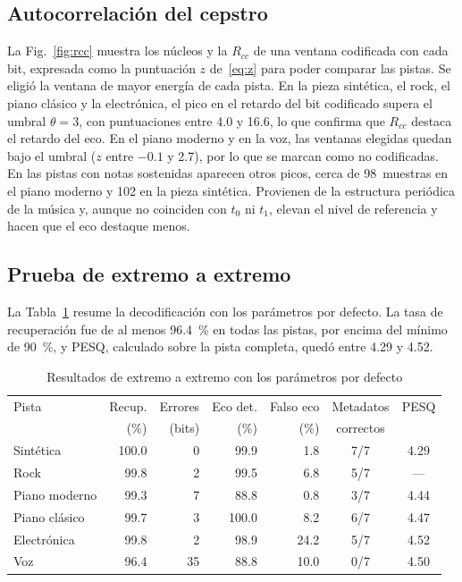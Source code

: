 \documentclass[journal]{IEEEtran}
\begin{document}
\subsection{Autocorrelación del cepstro}
La Fig.~\ref{fig:rcc} muestra los núcleos y la $R_{cc}$ de una ventana
codificada con cada bit, expresada como la puntuación $z$ de~\eqref{eq:z} para
poder comparar las pistas. Se eligió la ventana de mayor energía de cada pista.
En la pieza sintética, el rock, el piano clásico y la electrónica, el pico en
el retardo del bit codificado supera el umbral $\theta=3$, con puntuaciones
entre 4.0 y 16.6, lo que confirma que $R_{cc}$ destaca el retardo del eco. En
el piano moderno y en la voz, las ventanas elegidas quedan bajo el umbral ($z$
entre $-0.1$ y 2.7), por lo que se marcan como no codificadas. En las pistas
con notas sostenidas aparecen otros picos, cerca de 98~muestras en el piano
moderno y 102 en la pieza sintética. Provienen de la estructura periódica de la música y, aunque no
coinciden con $t_0$ ni $t_1$, elevan el nivel de referencia y hacen que el eco
destaque menos.

\subsection{Prueba de extremo a extremo}
La Tabla~\ref{tab:e2e} resume la decodificación con los parámetros por defecto.
La tasa de recuperación fue de al menos 96.4~\% en todas las pistas, por encima
del mínimo de 90~\%, y PESQ, calculado sobre la pista completa, quedó entre
4.29 y 4.52.

\begin{table}[!t]
\centering
\caption{Resultados de extremo a extremo con los parámetros por defecto}
\label{tab:e2e}
\footnotesize
\setlength{\tabcolsep}{3pt}
\begin{tabular}{lrrrrcc}
\toprule
Pista & Recup. & Errores & Eco det. & Falso eco & Metadatos & PESQ \\
 & (\%) & (bits) & (\%) & (\%) & correctos & \\
\midrule
Sintética     & 100.0 & 0  & 99.9  & 1.8  & 7/7 & 4.29 \\
Rock          &  99.8 & 2  & 99.5  & 6.8  & 5/7 & ---  \\
Piano moderno &  99.3 & 7  & 88.8  & 0.8  & 3/7 & 4.44 \\
Piano clásico &  99.7 & 3  & 100.0 & 8.2  & 6/7 & 4.47 \\
Electrónica   &  99.8 & 2  & 98.9  & 24.2 & 5/7 & 4.52 \\
Voz           &  96.4 & 35 & 88.8  & 10.0 & 0/7 & 4.50 \\
\bottomrule
\end{tabular}
\end{table}
\end{document}
